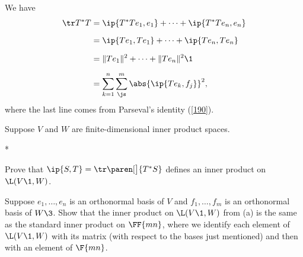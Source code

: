 \begin{Solution}
\begin{subtheorem}
\item
We have
\begin{align*}
\tr T^*T &= \ip{T^*Te_1, e_1} + \dots + \ip{T^*Te_n, e_n} \\[6bp]
&= \ip{Te_1, Te_1} + \dots + \ip{Te_n, Te_n} \\[6bp]
&= \|Te_1\|^2 + \dots + \|Te_n\|^2\1 \\[6bp]
&= \sum_{k=1}^n \sum_{\js}^m \abs{ \ip{Te_k, f_j} }^2,
\end{align*}
where the last line comes from Parseval's identity (\ref{190}).
\end{subtheorem}
\end{Solution}

\exercise
Suppose $V$ and $W$ are finite-dimensional inner product spaces.
\begin{subtheorem}*
\item
Prove that
$
\ip{S, T} = \tr \paren[\big]{T^*S}
$
defines an inner product on $\L(V\1, W)$.
\item
Suppose $e_1, \dots, e_n$ is an orthonormal basis of $V$ and $f_1, \ldots, f_m$ is an orthonormal basis of $W\3$. Show that the inner product on $\L(V\1, W)$ from (a) is the same as the standard inner product on $\FF{mn}$, where we
identify each element of $\L(V\1, W)$ with its matrix (with respect to the bases just mentioned) and then with an element of
$\F {mn}$.
\end{subtheorem}

